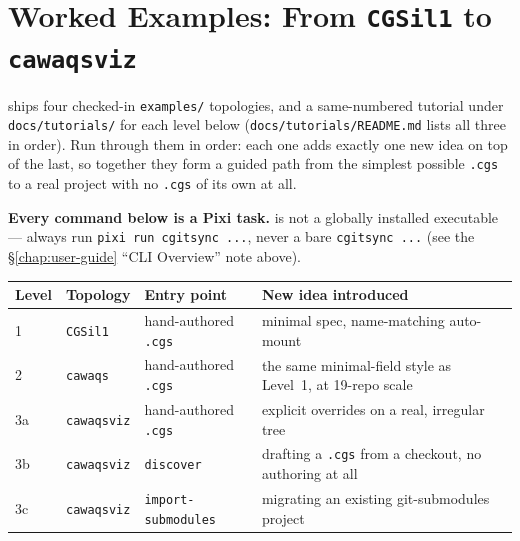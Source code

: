 \section{Worked Examples: From \texttt{CGSil1} to \texttt{cawaqsviz}}
\label{sec:worked-examples}

\cgspkg{} ships four checked-in \texttt{examples/} topologies, and a
same-numbered tutorial under \texttt{docs/tutorials/} for each level below
(\texttt{docs/tutorials/README.md} lists all three in order). Run through
them in order: each one adds exactly one new idea on top of the last, so
together they form a guided path from the simplest possible \texttt{.cgs}
to a real project with no \texttt{.cgs} of its own at all.

\textbf{Every command below is a Pixi task.} \cgscli{} is not a globally
installed executable --- always run \texttt{pixi run cgitsync ...}, never a
bare \texttt{cgitsync ...} (see the \S\ref{chap:user-guide} ``CLI
Overview'' note above).

\begin{center}
\begin{tabular}{lllp{5.3cm}}
\textbf{Level} & \textbf{Topology} & \textbf{Entry point} & \textbf{New idea introduced} \\
\hline
1 & \texttt{CGSil1} & hand-authored \texttt{.cgs} & minimal spec, name-matching auto-mount \\
2 & \texttt{cawaqs} & hand-authored \texttt{.cgs} & the same minimal-field style as Level~1, at 19-repo scale \\
3a & \texttt{cawaqsviz} & hand-authored \texttt{.cgs} & explicit overrides on a real, irregular tree \\
3b & \texttt{cawaqsviz} & \texttt{discover} & drafting a \texttt{.cgs} from a checkout, no authoring at all \\
3c & \texttt{cawaqsviz} & \texttt{import-submodules} & migrating an existing git-submodules project \\
\end{tabular}
\end{center}

